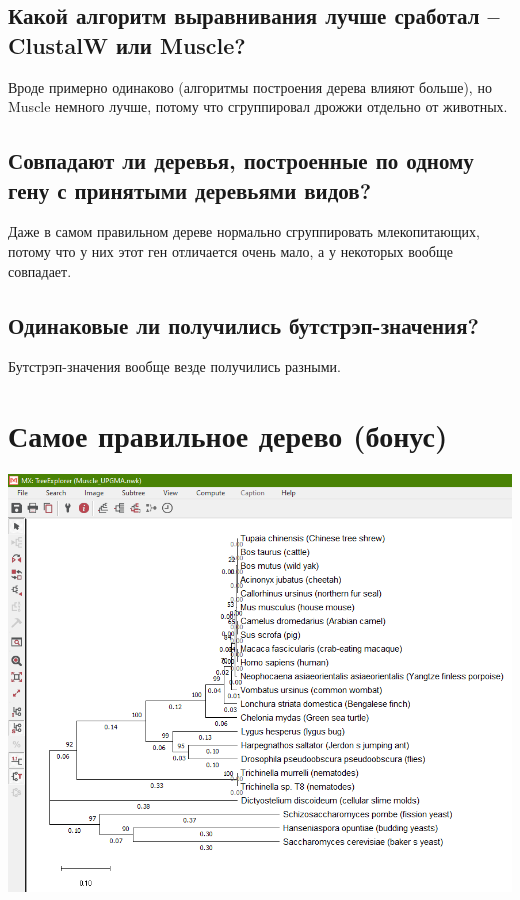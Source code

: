 \documentclass{article}
\begin{document}
  \subsection{Какой алгоритм выравнивания лучше сработал -- ClustalW или Muscle?}
  Вроде примерно одинаково (алгоритмы построения дерева влияют больше),
  но Muscle немного лучше, потому что сгруппировал дрожжи отдельно от животных.

  \subsection{Совпадают ли деревья, построенные по одному гену с принятыми деревьями видов?}
  Даже в самом правильном дереве нормально сгруппировать млекопитающих,
  потому что у них этот ген отличается очень мало, а у некоторых вообще совпадает.

  \subsection{Одинаковые ли получились бутстрэп-значения?}
  Бутстрэп-значения вообще везде получились разными.

  \section{Самое правильное дерево (бонус)}
  \includegraphics[width=\textwidth]{Muscle_UPGMA.png}
\end{document}

